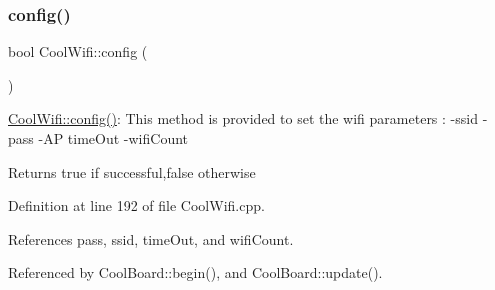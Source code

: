 \subsubsection{\texorpdfstring{config()}{config()}\hspace{0.1cm}{\footnotesize\ttfamily [1/2]}}
{\footnotesize\ttfamily bool Cool\+Wifi\+::config (\begin{DoxyParamCaption}{ }\end{DoxyParamCaption})}

\hyperlink{classCoolWifi_a4eb2f6b9b09dd588964b88b6c70122c0}{Cool\+Wifi\+::config()}\+: This method is provided to set the wifi parameters \+: -\/ssid -\/pass -\/\+AP time\+Out -\/wifi\+Count

\begin{DoxyReturn}{Returns}
true if successful,false otherwise 
\end{DoxyReturn}


Definition at line 192 of file Cool\+Wifi.\+cpp.



References pass, ssid, time\+Out, and wifi\+Count.



Referenced by Cool\+Board\+::begin(), and Cool\+Board\+::update().


